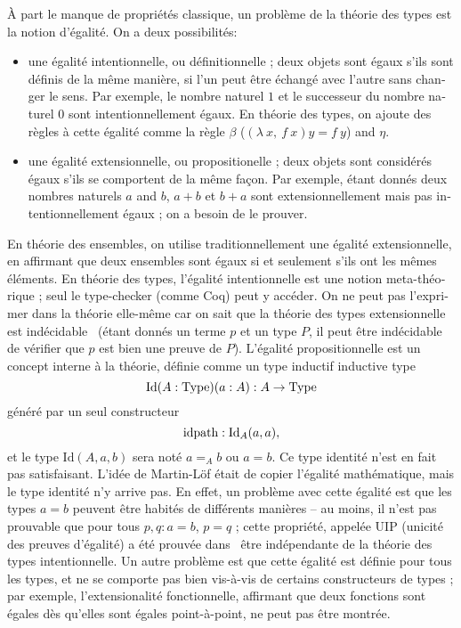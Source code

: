 \begin{otherlanguage}{french}
À part le manque de propriétés classique, un problème de la théorie
des types est la notion d'égalité. On a deux possibilités:
\begin{itemize}
\item une égalité intentionnelle, ou définitionnelle ; deux objets
  sont égaux s'ils sont définis de la même manière, \ie{} si l'un peut
  être échangé avec l'autre sans changer le sens. Par exemple, le
  nombre naturel $1$ et le successeur du nombre naturel 0 sont
  intentionnellement égaux. En théorie des types, on ajoute des règles
  à cette égalité comme la règle $\beta$ ($(\lambda\ x,\ f\ x)y = f\
  y$) and $\eta$.
\item une égalité extensionnelle, ou propositionelle ; deux objets
  sont considérés égaux s'ils se comportent de la même façon. Par
  exemple, étant donnés deux nombres naturels $a$ and $b$, $a+b$ et
  $b+a$ sont extensionnellement mais pas intentionnellement égaux ; on
  a besoin de le prouver.
\end{itemize}
En théorie des ensembles, on utilise traditionnellement une égalité
extensionnelle, en affirmant que deux ensembles sont égaux si et
seulement s'ils ont les mêmes éléments. En théorie des types,
l'égalité intentionnelle est une notion meta-théorique ; seul le
type-checker (comme Coq) peut y accéder. On ne peut pas l'exprimer
dans la théorie elle-même car on sait que la théorie des types
extensionnelle est indécidable~\cite{hofmann1995extensional} (étant
donnés un terme $p$ et un type $P$, il peut être indécidable de
vérifier que $p$ est bien une preuve de $P$). L'égalité
propositionnelle est un concept interne à la théorie, définie comme un
type inductif
inductive type
\[ \mathrm{Id} (A:\operatorname{Type}) (a:A) : A \to \operatorname{Type}
\] généré par un seul constructeur
\[ \mathrm{idpath} : \mathrm{Id}_A(a,a),
\] 
et le type $\mathrm{Id}(A,a,b)$ sera noté $a=_A b$ ou $a=b$. Ce type
identité n'est en fait pas satisfaisant. L'idée de Martin-Löf était de
copier l'égalité mathématique, mais le type identité n'y arrive
pas. En effet, un problème avec cette égalité est que les types $a=b$
peuvent être habités de différents manières -- au moins, il n'est pas
prouvable que pour tous $p,q:a=b$, $p=q$ ; cette propriété, appelée
UIP (unicité des preuves d'égalité) a été prouvée
dans~\cite{Hofmann96thegroupoid} être indépendante de la théorie des
types intentionnelle. Un autre problème est que cette égalité est
définie pour tous les types, et ne se comporte pas bien vis-à-vis de
certains constructeurs de types ; par exemple, l'extensionalité
fonctionnelle, affirmant que deux fonctions sont égales dès qu'elles
sont égales point-à-point, ne peut pas être montrée.


\end{otherlanguage}
